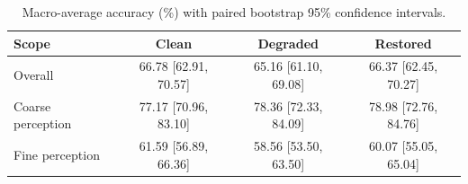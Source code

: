 \begin{table}[t]
\centering
\caption{Macro-average accuracy (\%) with paired bootstrap 95\% confidence intervals.}
\label{tab:paired_robustness}
\begin{tabular}{lccc}
\toprule
Scope & Clean & Degraded & Restored \\
\midrule
Overall & 66.78 [62.91, 70.57] & 65.16 [61.10, 69.08] & 66.37 [62.45, 70.27] \\
Coarse perception & 77.17 [70.96, 83.10] & 78.36 [72.33, 84.09] & 78.98 [72.76, 84.76] \\
Fine perception & 61.59 [56.89, 66.36] & 58.56 [53.50, 63.50] & 60.07 [55.05, 65.04] \\
\bottomrule
\end{tabular}
\end{table}
